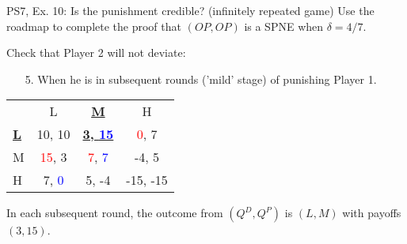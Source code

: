 \begin{frame}{PS7, Ex. 10: Is the punishment credible? (infinitely repeated game)}
  Use the roadmap to complete the proof that $(OP,OP)$ is a SPNE when $\delta=4/7$.\vspace{-4pt}
  \begin{multicols}{2}
    Check that Player 2 will not deviate:
    \begin{itemize}
      \item[5.] When he is in subsequent rounds ('mild' stage) of punishing Player 1.
    \end{itemize}
    \vfill\null\columnbreak
    \vspace{-6pt}
    \begin{table}
      \begin{tabular}{l|c|c|c|}
        \multicolumn{1}{c}{} & \multicolumn{1}{c}{L} & \multicolumn{1}{c}{\textbf{\underline{M}}} & \multicolumn{1}{c}{H} \\\cline{2-4}
        \textbf{\underline{L}} & 10, 10 & \textbf{\underline{3, \textcolor{blue}{15}}} & \textcolor{red}{0}, 7 \\\cline{2-4}
        M & \textcolor{red}{15}, 3 & \textcolor{red}{7}, \textcolor{blue}{7} & -4, 5 \\\cline{2-4}
        H & 7, \textcolor{blue}{0} & 5, -4 & -15, -15 \\\cline{2-4}
      \end{tabular}
    \end{table}
    \vspace{-8pt}
  \end{multicols}
    In each subsequent round, the outcome from $(Q^D,Q^P)$ is $(L,M)$ with payoffs $(3,15)$.
    \vfill\null
\end{frame}
